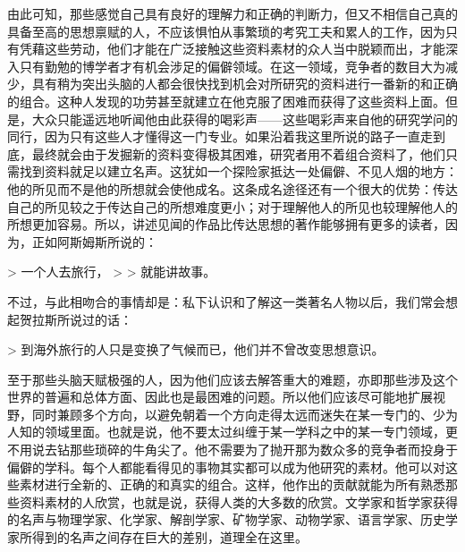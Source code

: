 \documentclass[12pt,oneside]{book}
\begin{document}
由此可知，那些感觉自己具有良好的理解力和正确的判断力，但又不相信自己真的具备至高的思想禀赋的人，不应该惧怕从事繁琐的考究工夫和累人的工作，因为只有凭藉这些劳动，他们才能在广泛接触这些资料素材的众人当中脱颖而出，才能深入只有勤勉的博学者才有机会涉足的偏僻领域。在这一领域，竞争者的数目大为减少，具有稍为突出头脑的人都会很快找到机会对所研究的资料进行一番新的和正确的组合。这种人发现的功劳甚至就建立在他克服了困难而获得了这些资料上面。但是，大众只能遥远地听闻他由此获得的喝彩声——这些喝彩声来自他的研究学问的同行，因为只有这些人才懂得这一门专业。如果沿着我这里所说的路子一直走到底，最终就会由于发掘新的资料变得极其困难，研究者用不着组合资料了，他们只需找到资料就足以建立名声。这犹如一个探险家抵达一处偏僻、不见人烟的地方：他的所见而不是他的所想就会使他成名。这条成名途径还有一个很大的优势：传达自己的所见较之于传达自己的所想难度更小；对于理解他人的所见也较理解他人的所想更加容易。所以，讲述见闻的作品比传达思想的著作能够拥有更多的读者，因为，正如阿斯姆斯所说的： 

 

> 一个人去旅行， 
>
> 就能讲故事。 

 

不过，与此相吻合的事情却是：私下认识和了解这一类著名人物以后，我们常会想起贺拉斯所说过的话： 

 

> 到海外旅行的人只是变换了气候而已，他们并不曾改变思想意识。 

 

至于那些头脑天赋极强的人，因为他们应该去解答重大的难题，亦即那些涉及这个世界的普遍和总体方面、因此也是最困难的问题。所以他们应该尽可能地扩展视野，同时兼顾多个方向，以避免朝着一个方向走得太远而迷失在某一专门的、少为人知的领域里面。也就是说，他不要太过纠缠于某一学科之中的某一专门领域，更不用说去钻那些琐碎的牛角尖了。他不需要为了抛开那为数众多的竞争者而投身于偏僻的学科。每个人都能看得见的事物其实都可以成为他研究的素材。他可以对这些素材进行全新的、正确的和真实的组合。这样，他作出的贡献就能为所有熟悉那些资料素材的人欣赏，也就是说，获得人类的大多数的欣赏。文学家和哲学家获得的名声与物理学家、化学家、解剖学家、矿物学家、动物学家、语言学家、历史学家所得到的名声之间存在巨大的差别，道理全在这里。 




\end{document}
